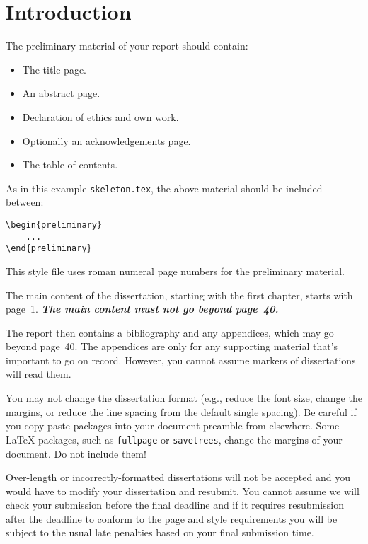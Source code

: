 \documentclass[main.tex]{subfiles}
\begin{document}
\chapter{Introduction}

    The preliminary material of your report should contain:
    \begin{itemize}
        \item The title page.
        \item An abstract page.
        \item Declaration of ethics and own work.
        \item Optionally an acknowledgements page.
        \item The table of contents.
    \end{itemize}

    As in this example \texttt{skeleton.tex}, the above material should be included
        between: \begin{verbatim}
\begin{preliminary}
    ...
\end{preliminary}
\end{verbatim} This style file uses roman numeral page numbers
        for the preliminary material.

    The main content of the dissertation, starting with the first chapter, starts
        with page~1.
    \emph{\textbf{The main content must not go beyond page~40.}}

    The report then contains a bibliography and any appendices, which may go beyond
        page~40.
    The appendices are only for any supporting material that's important to go on
        record.
    However, you cannot assume markers of dissertations will read them.

    You may not change the dissertation format (e.g., reduce the font size, change
        the margins, or reduce the line spacing from the default single spacing).
    Be careful if you copy-paste packages into your document preamble from
        elsewhere.
    Some \LaTeX{} packages, such as \texttt{fullpage} or \texttt{savetrees}, change
        the margins of your document.
    Do not include them!

    Over-length or incorrectly-formatted dissertations will not be accepted and you
        would have to modify your dissertation and resubmit.
    You cannot assume we will check your submission before the final deadline and
        if it requires resubmission after the deadline to conform to the page and style
        requirements you will be subject to the usual late penalties based on your
        final submission time.
\end{document}
